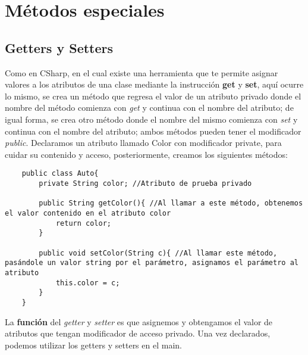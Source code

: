 \section{Métodos especiales}
\subsection{Getters y Setters}
Como en CSharp, en el cual existe una herramienta que te permite asignar valores a los atributos de una clase mediante la instrucción \textbf{get} y \textbf{set}, aquí ocurre lo mismo, se crea un método que regresa el valor de un atributo privado donde el nombre del método comienza con \textit{get} y continua con el nombre del atributo; de igual forma, se crea otro método donde el nombre del mismo comienza con \textit{set} y continua con el nombre del atributo; ambos métodos pueden tener el modificador \textit{public}. Declaramos un atributo llamado Color con modificador private, para cuidar su contenido y acceso, posteriormente, creamos los siguientes métodos:
\begin{lstlisting}
    public class Auto{
        private String color; //Atributo de prueba privado
        
        public String getColor(){ //Al llamar a este método, obtenemos el valor contenido en el atributo color
            return color;
        }
        
        public void setColor(String c){ //Al llamar este método, pasándole un valor string por el parámetro, asignamos el parámetro al atributo
            this.color = c;
        }
    }
\end{lstlisting}
La \textbf{función} del \textit{getter} y \textit{setter} es que asignemos y obtengamos el valor de atributos que tengan modificador de acceso privado. Una vez declarados, podemos utilizar los getters y setters en el main.

